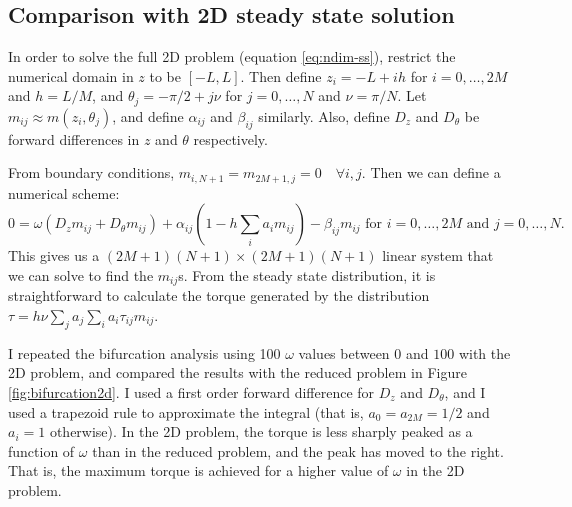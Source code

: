 \documentclass{article}
\begin{document}
\subsection{Comparison with 2D steady state solution}
\label{sec:comparison-with-2d}

In order to solve the full 2D problem (equation \eqref{eq:ndim-ss}),
restrict the numerical domain in $z$ to be $[-L, L]$. Then define $z_i
= -L + ih$ for $i = 0, \hdots, 2M$ and $h = L/M$, and $\theta_j =
-\pi/2 + j\nu$ for $j = 0, \hdots, N$ and $\nu = \pi/N$. Let $m_{ij}
\approx m(z_i, \theta_j)$, and define $\alpha_{ij}$ and $\beta_{ij}$
similarly. Also, define $D_z$ and $D_\theta$ be forward differences in
$z$ and $\theta$ respectively.

From boundary conditions, $m_{i,N+1} = m_{2M+1, j} = 0 \quad \forall
i,j$. Then we can define a numerical scheme:
\begin{equation}
  0 = \omega(D_z m_{ij} + D_\theta m_{ij}) + \alpha_{ij} \left(1 - h
    \sum_i a_i m_{ij} \right) - \beta_{ij} m_{ij} \text{ for } i=0,
  \hdots, 2M \text{ and } j=0, \hdots, N.
\end{equation}
This gives us a $(2M+1)(N+1) \times (2M+1)(N+1)$ linear system that we
can solve to find the $m_{ij}$s. From the steady state distribution,
it is straightforward to calculate the torque generated by the
distribution $\tau = h \nu \sum_j a_j \sum_i a_i \tau_{ij} m_{ij}$.

I repeated the bifurcation analysis using 100 $\omega$ values between
$0$ and $100$ with the 2D problem, and compared the results with the
reduced problem in Figure \ref{fig:bifurcation2d}. I used a first
order forward difference for $D_z$ and $D_\theta$, and I used a
trapezoid rule to approximate the integral (that is, $a_0 = a_{2M} =
1/2$ and $a_i = 1$ otherwise). In the 2D problem, the torque is less
sharply peaked as a function of $\omega$ than in the reduced problem,
and the peak has moved to the right. That is, the maximum torque is
achieved for a higher value of $\omega$ in the 2D problem.
\end{document}
